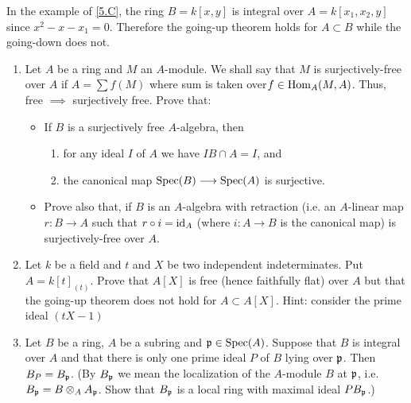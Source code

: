 \documentclass[../main]{subfiles}
\begin{document}
\begin{remark}
In the example of \ref{5.C}, the ring $B=k[x, y]$ is integral over ${A}={k}[{x}_1, {x}_2, {y}]$ since ${x}^2-{x}-{x}_1=0$. Therefore the going-up theorem holds for $A \subset B$ while the going-down does not.
\end{remark}

\begin{exercise*}
\begin{enumerate}[label = \arabic*.]
\item Let $A$ be a ring and $M$ an $A$-module. We shall say that $M$ is surjectively-free over $A$ if $A=\sum f(M)$ where sum is taken over\newline $f \in \operatorname{Hom}_A(M, A)$. Thus, free $\implies$ surjectively free. Prove that:
\begin{itemize}
    \item If $B$ is a surjectively free $A$-algebra, then 
    \begin{enumerate}[label= (\roman*)]
        \item for any ideal $I$ of $A$ we have $I B \cap A=I$, and
        \item the canonical map $\operatorname{Spec}(B) \longrightarrow \operatorname{Spec}(A)$ is surjective.
    \end{enumerate}
    \item Prove also that, if $B$ is an $A$-algebra with retraction (i.e. an $A$-linear map $r: B \longrightarrow A$ such that $r \circ i=\operatorname{id}_A$ (where $i: A \longrightarrow B$ is the canonical map) is surjectively-free over $A$.
\end{itemize} 
\item Let $k$ be a field and $t$ and $X$ be two independent indeterminates. Put $A=k[t]_{(t)}$. Prove that $A[X]$ is free (hence faithfully flat) over $A$ but that the going-up theorem does not hold for $A \subset A[X]$. Hint: consider the prime ideal $(t X-1)$
\item Let $B$ be a ring, $A$ be a subring and $\mathfrak{p} \in \operatorname{Spec}(A)$. Suppose that $B$ is integral over $A$ and that there is only one prime ideal $P$ of $B$ lying over $\mathfrak{p}$. Then $B_P=B_{\mathfrak{p}}$. (By $B_{\mathfrak{p}}$ we mean the localization of the $A$-module $B$ at $\mathfrak{p}$, i.e. $B_{\mathfrak{p}}= B \otimes_A A_{\mathfrak{p}}$. Show that $B_{\mathfrak{p}}$ is a local ring with maximal ideal $PB_{\mathfrak{p}}$.)
\end{enumerate}
\end{exercise*} 
\end{document}
